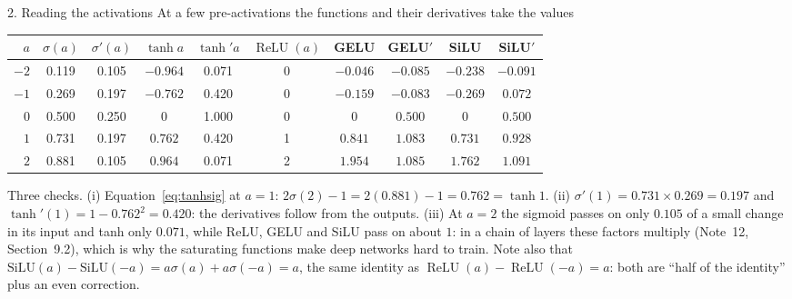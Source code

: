 \documentclass[11pt]{article}
\newcommand{\relu}{\operatorname{ReLU}}
\begin{document}
\begin{worked}{2. Reading the activations}
At a few pre-activations the functions and their derivatives take the values
\begin{center}\small
\begin{tabular}{@{}rccccccccc@{}}
\toprule
$a$ & $\sigma(a)$ & $\sigma'(a)$ & $\tanh a$ & $\tanh' a$ & $\relu(a)$ & GELU & GELU$'$ & SiLU & SiLU$'$ \\
\midrule
$-2$ & 0.119 & 0.105 & $-0.964$ & 0.071 & 0 & $-0.046$ & $-0.085$ & $-0.238$ & $-0.091$ \\
$-1$ & 0.269 & 0.197 & $-0.762$ & 0.420 & 0 & $-0.159$ & $-0.083$ & $-0.269$ & $0.072$ \\
$0$ & 0.500 & 0.250 & $0$ & 1.000 & 0 & $0$ & $0.500$ & $0$ & $0.500$ \\
$1$ & 0.731 & 0.197 & $0.762$ & 0.420 & 1 & $0.841$ & $1.083$ & $0.731$ & $0.928$ \\
$2$ & 0.881 & 0.105 & $0.964$ & 0.071 & 2 & $1.954$ & $1.085$ & $1.762$ & $1.091$ \\
\bottomrule
\end{tabular}
\end{center}
Three checks. (i) Equation~\eqref{eq:tanhsig} at $a = 1$: $2\sigma(2) - 1 = 2(0.881) - 1 = 0.762 = \tanh 1$.
(ii) $\sigma'(1) = 0.731 \times 0.269 = 0.197$ and $\tanh'(1) = 1 - 0.762^2 = 0.420$: the derivatives follow from the
outputs. (iii) At $a = 2$ the sigmoid passes on only $0.105$ of a small change in its input and tanh only $0.071$,
while ReLU, GELU and SiLU pass on about $1$: in a chain of layers these factors multiply (Note~12, Section~9.2), which is why the
saturating functions make deep networks hard to train. Note also that $\mathrm{SiLU}(a) - \mathrm{SiLU}(-a) =
a\sigma(a) + a\sigma(-a) = a$, the same identity as $\relu(a) - \relu(-a) = a$: both are ``half of the identity'' plus
an even correction.
\end{worked}
\end{document}
